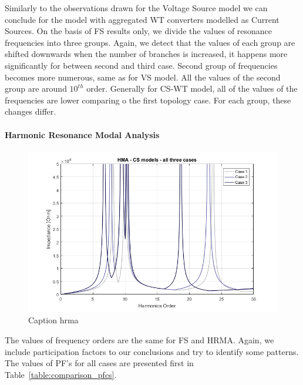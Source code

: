 \documentclass[12pt]{report} %
\begin{document}
Similarly to the observations drawn for the Voltage Source model we can conclude for the model with aggregated WT converters modelled as Current Sources. On the basis of FS results only, we divide the values of resonance frequencies into three groups. Again, we detect that the values of each group are shifted downwards when the number of branches is increased, it happens more significantly for between second and third case. Second group of frequencies becomes more numerous, same as for VS model. All the values of the second group are around $10^{th}$ order. Generally for CS-WT model, all of the values of the frequencies are lower comparing o the first topology case. For each group, these changes differ.

\paragraph{Harmonic Resonance Modal Analysis}

\begin{figure}[htb]
	\centering
	\includegraphics[width=1\textwidth]{img/Case123/HRMA_CS.png}
	\caption{Caption hrma}
  	\label{fig:comparison_hrmacs}
\end{figure}
\FloatBarrier

The values of frequency orders are the same for FS and HRMA. Again, we include participation factors to our conclusions and try to identify some patterns. The values of PF’s for all cases are presented first in Table~\ref{table:comparison_pfcs}.
\end{document}
